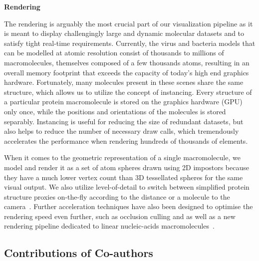 \textbf{Rendering}

The rendering is arguably the most crucial part of our visualization pipeline as it is meant to display challengingly large and dynamic molecular datasets and to satisfy tight real-time requirements.
Currently, the virus and bacteria models that can be modelled at atomic resolution consist of thousands to millions of macromolecules, themselves composed of a few thousands atoms, resulting in an overall memory footprint that exceeds the capacity of today's high end graphics hardware.
Fortunately, many molecules present in these scenes share the same structure, which allows us to utilize the concept of instancing.
Every structure of a particular protein macromolecule is stored on the graphics hardware (GPU) only once, while the positions and orientations of the molecules is stored separably.
Instancing is useful for reducing the size of redundant datasets, but also helps to reduce the number of necessary draw calls, which tremendously accelerates the performance when rendering hundreds of thousands of elements. 

When it comes to the geometric representation of a single macromolecule, we model and render it as a set of atom spheres drawn using 2D impostors because they have a much lower vertex count than 3D tessellated spheres for the same visual output.
We also utilize level-of-detail to switch between simplified protein structure proxies on-the-fly according to the distance or a molecule to the camera~\cite{le2014illustrative}.
Further acceleration techniques have also been designed to optimise the rendering speed even further, such as occlusion culling and as well as a new rendering pipeline dedicated to linear nucleic-acids macromolecules~\cite{le2015cellview}. 

\subsection{Contributions of Co-authors}

